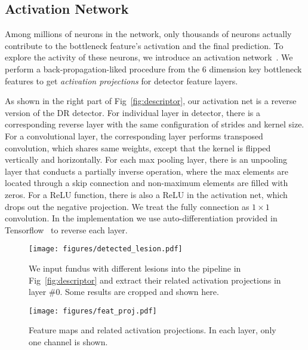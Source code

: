\documentclass[letterpaper]{article} %
\begin{document}
	
	\subsection{Activation Network}
    
    Among millions of neurons in the network, only thousands of neurons actually contribute to the bottleneck feature's activation and the final prediction. To explore the activity of these neurons, we introduce an activation network~\cite{zeiler2014visualizing}. We perform a back-propagation-liked procedure from the $6$ dimension key bottleneck features to get \emph{activation projections} for detector feature layers.

    As shown in the right part of Fig~\ref{fig:descriptor}, our activation net is a reverse version of the DR detector. For individual layer in detector, there is a corresponding reverse layer with the same configuration of strides and kernel size. For a convolutional layer, the corresponding layer performs transposed convolution, which shares same weights, except that the kernel is flipped vertically and horizontally. For each max pooling layer, there is an unpooling layer that conducts a partially inverse operation, where the max elements are located through a skip connection and non-maximum elements are filled with zeros. For a ReLU function, there is also a ReLU in the activation net, which drops out the negative projection. We treat the fully connection as $1\times 1$ convolution. In the implementation we use auto-differentiation provided in Tensorflow~\cite{abadi2016tensorflow} to reverse each layer. %
   
	\begin{figure}[t]
		\begin{center}
			\texttt{[image: figures/detected\_lesion.pdf]}
		\end{center}
		\caption{We input fundus with different lesions into the pipeline in Fig~\ref{fig:descriptor} and extract their related activation projections in layer \#0. Some results are cropped and shown here. }
		\label{fig:detected_lesion}
	\end{figure}
	
	\begin{figure}[t]
		\begin{center}
			\texttt{[image: figures/feat\_proj.pdf]}
		\end{center}
		\caption{Feature maps and related activation projections. In each layer, only one channel is shown. }
		\label{fig:feat_proj}
	\end{figure}
	
\end{document}
